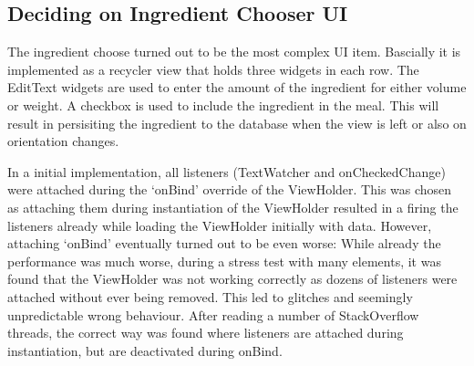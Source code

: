 \documentclass[a4paper,11pt,twoside]{article}
\begin{document}
\subsection{Deciding on Ingredient Chooser UI}
The ingredient choose turned out to be the most complex UI item. Bascially it is
implemented as a recycler view that holds three widgets in each row. The EditText
widgets are used to enter the amount of the ingredient for either volume or weight.
A checkbox is used to include the ingredient in the meal. This will result in
persisiting the ingredient to the database when the view is left or also on
orientation changes.

In a initial implementation, all listeners (TextWatcher and onCheckedChange) were
attached during the `onBind' override of the ViewHolder. This was chosen as attaching
them during instantiation of the ViewHolder resulted in a firing the listeners
already while loading the ViewHolder initially with data. However, attaching `onBind'
eventually turned out to be even worse: While already the performance was much worse,
during a stress test with many elements, it was found that the ViewHolder was not
working correctly as dozens of listeners were attached without ever being removed.
This led to glitches and seemingly unpredictable wrong behaviour.
After reading a number of StackOverflow threads, the correct way was found where
listeners are attached during instantiation, but are deactivated during onBind.


%
\end{document}
